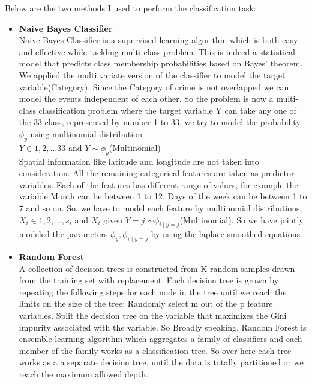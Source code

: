 \documentclass[conference]{IEEEtran}
\begin{document}
Below are the two methods I used to perform the classification task:\\
\begin{itemize}
  \item \textbf{Naive Bayes  Classifier}\\
  Naive Bayes Classifier is a supervised learning algorithm which is both easy and effective while tackling multi class problem. This is indeed a statistical model that predicts class membership probabilities based on Bayes' theorem.  We applied the multi variate version of the classifier to model the target variable(Category). Since the Category of crime is not overlapped we can model the events independent of each other. So the problem is now a multi-class classification problem where the target variable Y can take any one of the 33 class, represented by number 1 to 33. we try to model the probability $\phi_{y}$ using multinomial distribution\\
  
  $Y \in {1,2,...33}$ and $Y \sim \phi_{y}$(Multinomial)\\
  Spatial information like latitude and longitude are not taken into consideration. All the remaining categorical features are taken as predictor variables. Each of the features has different range of values, for example the variable Month can be between 1 to 12, Days of the week can be between 1 to 7 and so on. So, we have to model each feature by multinomial distributions, 
  $X_i\in {1,2,...,s_{i}}$ and $X_{i}$ given $Y=j$ $\sim \phi_{i\mid y=j}$(Multinomial). So we have jointly modeled the parameters $\phi_{y} , \phi_{i\mid y=j}$ by using the laplace smoothed equations.\\
   \item \textbf{Random Forest}\\
  A collection of decision trees  is constructed from K random samples drawn from the training set with replacement. Each decision tree is grown by repeating the following steps for each node in the tree until we reach the limits on the size of the tree:
  Randomly select m out of the p feature variables. Split the decision tree on the variable that maximizes the Gini impurity associated with the variable. So Broadly speaking, Random Forest is ensemble learning algorithm which aggregates a family of classifiers and each member of the family works as a classification tree. So over here each tree works as a a separate decision tree, until the data is totally partitioned or we reach the maximum allowed depth. 
\end{itemize}  
\end{document}
